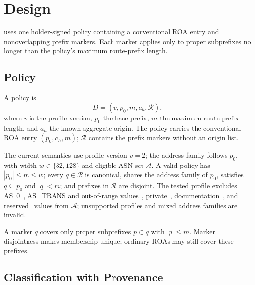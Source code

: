 \section{\ssrov{} Design}
\label{sec:design}

\ssrov{} uses one holder-signed policy containing a conventional ROA entry and nonoverlapping prefix markers. Each marker applies only to proper subprefixes no longer than the policy's maximum route-prefix length.

\subsection{\ssrov{} Policy}

A policy is
\begin{equation}
D=(v,p_0,m,a_h,\mathcal{R}),
\end{equation}
where $v$ is the profile version, $p_0$ the base prefix, $m$ the maximum route-prefix length, and $a_h$ the known aggregate origin. The policy carries the conventional ROA entry $(p_0,a_h,m)$; $\mathcal{R}$ contains the prefix markers without an origin list.

The current semantics use profile version $v=2$; the address family follows $p_0$, with width $w\in\{32,128\}$ and eligible ASN set $\mathcal{A}$. A valid policy has $|p_0|\leq m\leq w$; every $q\in\mathcal{R}$ is canonical, shares the address family of $p_0$, satisfies $q\subseteq p_0$ and $|q|<m$; and prefixes in $\mathcal{R}$ are disjoint. The tested profile excludes AS~0~\cite{rfc7607}, AS\_TRANS and out-of-range values~\cite{rfc6793}, private~\cite{rfc6996}, documentation~\cite{rfc5398}, and reserved~\cite{iana-as-numbers} values from $\mathcal{A}$; unsupported profiles and mixed address families are invalid.

A marker $q$ covers only proper subprefixes $p\subset q$ with $|p|\leq m$. Marker disjointness makes membership unique; ordinary ROAs may still cover these prefixes.

\subsection{Classification with Provenance}

